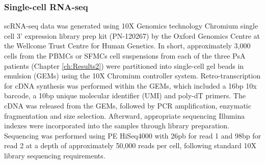 \subsubsection{Single-cell RNA-seq} 
\label{scRNA_processing}
scRNA-seq data was generated using 10X Genomics technology Chromium single cell 3' expression library prep kit (PN-120267) by the Oxford Genomics Centre at the Wellcome Trust Centre for Human Genetics. In short, approximately 3,000 cells from the PBMCs or SFMCs cell suspensions from each of the three PsA patients (Chapter \ref{ch:Results2}) were partitioned into single-cell gel beads in emulsion (GEMs) using the 10X Chromium controller system. Retro-transcription for cDNA synthesis was performed within the GEMs, which included a 16bp 10x barcode, a 10bp unique molecular identifier (UMI) and poly-dT primers. The cDNA was released from the GEMs, followed by PCR amplification, enzymatic fragmentation and size selection. Afterward, appropriate sequencing Illumina indexes were incorporated into the samples through library preparation. Sequencing was performed using PE HiSeq4000 with 26pb for read 1 and 98bp for read 2 at a depth of approximately 50,000 reads per cell, following standard 10X library sequencing requirements. 







